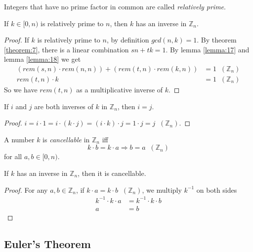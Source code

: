 \documentclass[11pt]{article}
\begin{document}
\begin{definition}
Integers that have no prime factor in common are called \emph{relatively prime}.
\end{definition}

\begin{lemma}
If $k \in [0, n)$ is relatively prime to $n$, then $k$ has an inverse in $\mathbb{Z}_n$.
\end{lemma}

\begin{proof}
If $k$ is relatively prime to $n$, by definition $gcd(n,k) = 1$. By theorem
\ref{theorem:7}, there is a linear combination $sn+tk=1$. By lemma \ref{lemma:17} and lemma
\ref{lemma:18} we get
\begin{align*}
  (rem(s,n) \cdot rem(n,n)) + (rem(t,n) \cdot rem(k,n)) &= 1 \;\;(\mathbb{Z}_n) \\
  rem(t,n) \cdot k &= 1 \;\;(\mathbb{Z}_n)
\end{align*}
So we have $rem(t,n)$ as a multiplicative inverse of $k$.
\end{proof}

\begin{lemma}
If $i$ and $j$ are both inverses of $k$ in $\mathbb{Z}_n$, then $i = j$.
\end{lemma}

\begin{proof}
$i = i \cdot 1 = i \cdot (k \cdot j) = (i \cdot k) \cdot j = 1 \cdot j = j
\;\;(\mathbb{Z}_n)$.
\end{proof}

\begin{definition}
A number $k$ is \emph{cancellable} in $\mathbb{Z}_n$ iff
\[
  k \cdot b = k \cdot a \Rightarrow b = a \;\;(\mathbb{Z}_n)
\]
for all $a, b \in [0, n)$.
\end{definition}

\begin{lemma}
If $k$ has an inverse in $\mathbb{Z}_n$, then it is cancellable.
\end{lemma}

\begin{proof}
For any $a, b \in \mathbb{Z}_n$, if $k \cdot a = k \cdot b \;\;(\mathbb{Z}_n)$, we multiply
$k^{-1}$ on both sides
\begin{align*}
k^{-1} \cdot k \cdot a &= k^{-1} \cdot k \cdot b \\
a &= b
\end{align*}
\end{proof}

\subsection{Euler's Theorem}
\end{document}
